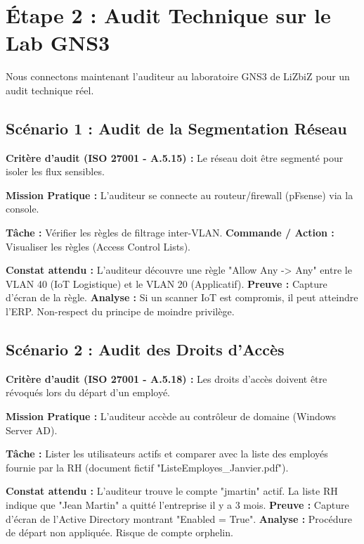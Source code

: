 \section{Étape 2 : Audit Technique sur le Lab GNS3}

Nous connectons maintenant l'auditeur au laboratoire GNS3 de LiZbiZ pour un audit technique réel.

\subsection{Scénario 1 : Audit de la Segmentation Réseau}

\textbf{Critère d'audit (ISO 27001 - A.5.15) :} Le réseau doit être segmenté pour isoler les flux sensibles.

\begin{boxlizbiz}
\textbf{Mission Pratique :}
L'auditeur se connecte au routeur/firewall (pFsense) via la console.

\textbf{Tâche :} Vérifier les règles de filtrage inter-VLAN.
\textbf{Commande / Action :} Visualiser les règles (Access Control Lists).

\textbf{Constat attendu :}
L'auditeur découvre une règle "Allow Any -> Any" entre le VLAN 40 (IoT Logistique) et le VLAN 20 (Applicatif).
\textbf{Preuve :} Capture d'écran de la règle.
\textbf{Analyse :} Si un scanner IoT est compromis, il peut atteindre l'ERP. Non-respect du principe de moindre privilège.
\end{boxlizbiz}

\subsection{Scénario 2 : Audit des Droits d'Accès}

\textbf{Critère d'audit (ISO 27001 - A.5.18) :} Les droits d'accès doivent être révoqués lors du départ d'un employé.

\begin{boxlizbiz}
\textbf{Mission Pratique :}
L'auditeur accède au contrôleur de domaine (Windows Server AD).

\textbf{Tâche :} Lister les utilisateurs actifs et comparer avec la liste des employés fournie par la RH (document fictif "ListeEmployes\_Janvier.pdf").

\textbf{Constat attendu :}
L'auditeur trouve le compte "jmartin" actif. La liste RH indique que "Jean Martin" a quitté l'entreprise il y a 3 mois.
\textbf{Preuve :} Capture d'écran de l'Active Directory montrant "Enabled = True".
\textbf{Analyse :} Procédure de départ non appliquée. Risque de compte orphelin.
\end{boxlizbiz}

